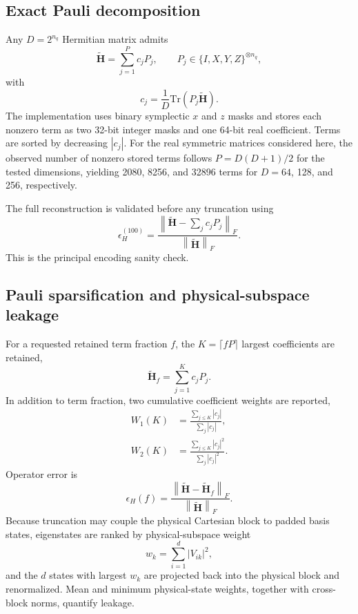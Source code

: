 \documentclass[aip,jcp,reprint,amsmath,amssymb,floatfix]{revtex4-2}
\newcommand{\Hp}{\widetilde{\mathbf{H}}}
\newcommand{\Hf}{\widetilde{\mathbf{H}}_{f}}
\newcommand{\Tr}{\mathrm{Tr}}
\newcommand{\norm}[1]{\left\lVert #1 \right\rVert}
\begin{document}
\subsection{Exact Pauli decomposition}
Any $D=2^{n_q}$ Hermitian matrix admits
\begin{equation}
\Hp=\sum_{j=1}^{P} c_j P_j,
\qquad P_j\in\{I,X,Y,Z\}^{\otimes n_q},
\label{eq:paulidecomp}
\end{equation}
with
\begin{equation}
c_j=\frac{1}{D}\Tr(P_j\Hp).
\label{eq:paulicoeff}
\end{equation}
The implementation uses binary symplectic $x$ and $z$ masks and stores each nonzero term as two 32-bit integer masks and one 64-bit real coefficient. Terms are sorted by decreasing $|c_j|$. For the real symmetric matrices considered here, the observed number of nonzero stored terms follows $P=D(D+1)/2$ for the tested dimensions, yielding 2080, 8256, and 32896 terms for $D=64$, 128, and 256, respectively.

The full reconstruction is validated before any truncation using
\begin{equation}
\epsilon_H^{(100)}=
\frac{\norm{\Hp-\sum_jc_jP_j}_F}{\norm{\Hp}_F}.
\label{eq:fullpaulierr}
\end{equation}
This is the principal encoding sanity check.

\subsection{Pauli sparsification and physical-subspace leakage}
For a requested retained term fraction $f$, the $K=\lceil fP\rceil$ largest coefficients are retained,
\begin{equation}
\Hf=\sum_{j=1}^{K}c_jP_j.
\label{eq:compressedH}
\end{equation}
In addition to term fraction, two cumulative coefficient weights are reported,
\begin{align}
W_1(K)&=\frac{\sum_{j\le K}|c_j|}{\sum_j|c_j|},\\
W_2(K)&=\frac{\sum_{j\le K}|c_j|^2}{\sum_j|c_j|^2}.
\label{eq:weights}
\end{align}
Operator error is
\begin{equation}
\epsilon_H(f)=\frac{\norm{\Hp-\Hf}_F}{\norm{\Hp}_F}.
\label{eq:operror}
\end{equation}
Because truncation may couple the physical Cartesian block to padded basis states, eigenstates are ranked by physical-subspace weight
\begin{equation}
w_k=\sum_{i=1}^{d}|V_{ik}|^2,
\end{equation}
and the $d$ states with largest $w_k$ are projected back into the physical block and renormalized. Mean and minimum physical-state weights, together with cross-block norms, quantify leakage.
\end{document}
